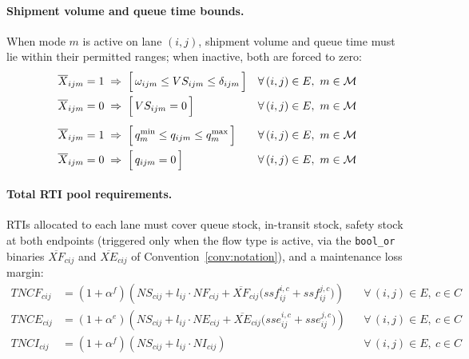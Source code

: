 \paragraph{Shipment volume and queue time bounds.}
When mode $m$ is active on lane $(i,j)$, shipment volume and
queue time must lie within their permitted ranges; when inactive,
both are forced to zero:
%
\begin{align}
  \overline{X}_{ijm} = 1
    &\;\Rightarrow\;
    \Bigl[\,\omega_{ijm} \leq VS_{ijm} \leq \delta_{ijm}\,\Bigr]
  && \forall\,(i,j)\in E,\ m\in\mathcal{M}
  \label{eq:vol-bounds-on}\\
  \overline{X}_{ijm} = 0
    &\;\Rightarrow\;
    \Bigl[\,VS_{ijm} = 0\,\Bigr]
  && \forall\,(i,j)\in E,\ m\in\mathcal{M}
  \label{eq:vol-bounds-off}\\[4pt]
  \overline{X}_{ijm} = 1
    &\;\Rightarrow\;
    \Bigl[\,q^{\min}_{m} \leq q_{ijm} \leq q^{\max}_{m}\,\Bigr]
  && \forall\,(i,j)\in E,\ m\in\mathcal{M}
  \label{eq:q-bounds-on}\\
  \overline{X}_{ijm} = 0
    &\;\Rightarrow\;
    \Bigl[\,q_{ijm} = 0\,\Bigr]
  && \forall\,(i,j)\in E,\ m\in\mathcal{M}
  \label{eq:q-bounds-off}
\end{align}


\paragraph{Total RTI pool requirements.}
RTIs allocated to each lane must cover queue stock, in-transit
stock, safety stock at both endpoints (triggered only when the
flow type is active, via the \texttt{bool\_or} binaries
$\overline{XF}_{cij}$ and $\overline{XE}_{cij}$ of
Convention~\ref{conv:notation}), and a maintenance loss margin:
%
\begin{align}
  TNCF_{cij}
  &= (1+\alpha^{f})\!\left(
       NS_{cij}
       + l_{ij}\cdot NF_{cij}
       + \overline{XF}_{cij}
         \bigl(ssf^{i,c}_{ij}+ssf^{j,c}_{ij}\bigr)
     \right)
  && \forall\,(i,j)\in E,\ c\in C
  \label{eq:pool-full}\\[4pt]
  TNCE_{cij}
  &= (1+\alpha^{e})\!\left(
       NS_{cij}
       + l_{ij}\cdot NE_{cij}
       + \overline{XE}_{cij}
         \bigl(sse^{i,c}_{ij}+sse^{j,c}_{ij}\bigr)
     \right)
  && \forall\,(i,j)\in E,\ c\in C
  \label{eq:pool-empty}\\[4pt]
  TNCI_{cij}
  &= (1+\alpha^{f})\!\left(
       NS_{cij}
       + l_{ij}\cdot NI_{cij}
     \right)
  && \forall\,(i,j)\in E,\ c\in C
  \label{eq:pool-inlay}
\end{align}

